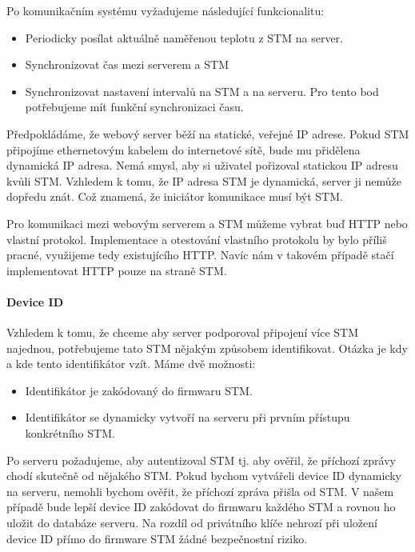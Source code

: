 
Po komunikačním systému vyžadujeme následující funkcionalitu:
\begin{itemize}
    \item Periodicky posílat aktuálně naměřenou teplotu z STM na server.
    \item Synchronizovat čas mezi serverem a STM
    \item Synchronizovat nastavení intervalů na STM a na serveru.
          Pro tento bod potřebujeme mít funkční synchronizaci času.
\end{itemize}

Předpokládáme, že webový server běží na statické, veřejné IP adrese.
Pokud STM připojíme ethernetovým kabelem do internetové sítě, bude mu přidělena dynamická IP adresa.
Nemá smysl, aby si uživatel pořizoval statickou IP adresu kvůli STM.
Vzhledem k tomu, že IP adresa STM je dynamická, server ji nemůže dopředu znát.
Což znamená, že iniciátor komunikace musí být STM.

Pro komunikaci mezi webovým serverem a STM můžeme vybrat buď HTTP nebo vlastní protokol.
Implementace a otestování vlastního protokolu by bylo příliš pracné, využijeme tedy existujícího HTTP.
Navíc nám v takovém případě stačí implementovat HTTP pouze na straně STM.

\paragraph{Device ID}
Vzhledem k tomu, že chceme aby server podporoval připojení více STM najednou, potřebujeme
tato STM nějakým způsobem identifikovat.
Otázka je kdy a kde tento identifikátor vzít.
Máme dvě možnosti:
\begin{itemize}
  \item Identifikátor je zakódovaný do firmwaru STM.
  \item Identifikátor se dynamicky vytvoří na serveru při prvním přístupu konkrétního STM.
\end{itemize}
Po serveru požadujeme, aby autentizoval STM tj. aby ověřil, že příchozí zprávy chodí skutečně
od nějakého STM.
Pokud bychom vytvářeli device ID dynamicky na serveru, nemohli bychom ověřit, že
příchozí zpráva přišla od STM.
V našem případě bude lepší device ID zakódovat do firmwaru každého STM a rovnou ho uložit
do databáze serveru.
Na rozdíl od privátního klíče nehrozí při uložení device ID přímo do firmware STM
žádné bezpečnostní riziko.

